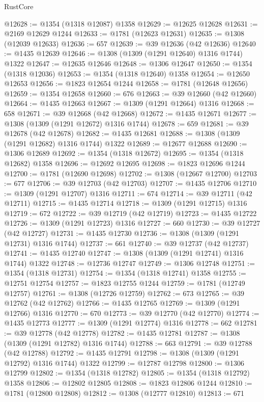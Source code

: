 \begin{lexlean}{RustCore}
\begin{coremodule}
@12628 := @1354 (@1318 @12087) @1358
@12629 := @12625 @12628
@12631 := @2169 @12629 @1244
@12633 := @1781 (@12623 @12631)
@12635 := @1308 (@12039 @12633)
@12636 := 657
@12639 := @39 @12636 (@42 @12636)
@12640 := @1435 @12639
@12646 := @1308 (@1309 (@1291 @12640) @1316 @1744) @1322
@12647 := @12635 @12646
@12648 := @1306 @12647
@12650 := @1354 (@1318 @12036)
@12653 := @1354 (@1318 @12640) @1358
@12654 := @12650 @12653
@12656 := @1823 @12654 @1244
@12658 := @1781 (@12648 @12656)
@12659 := @1354 @12658
@12660 := 676
@12663 := @39 @12660 (@42 @12660)
@12664 := @1435 @12663
@12667 := @1309 (@1291 @12664) @1316
@12668 := 658
@12671 := @39 @12668 (@42 @12668)
@12672 := @1435 @12671
@12677 := @1308 (@1309 (@1291 @12672) @1316 @1744)
@12678 := 659
@12681 := @39 @12678 (@42 @12678)
@12682 := @1435 @12681
@12688 := @1308 (@1309 (@1291 @12682) @1316 @1744) @1322
@12689 := @12677 @12688
@12690 := @1306 @12689
@12692 := @1354 (@1318 @12672)
@12695 := @1354 (@1318 @12682) @1358
@12696 := @12692 @12695
@12698 := @1823 @12696 @1244
@12700 := @1781 (@12690 @12698)
@12702 := @1308 (@12667 @12700)
@12703 := 677
@12706 := @39 @12703 (@42 @12703)
@12707 := @1435 @12706
@12710 := @1309 (@1291 @12707) @1316
@12711 := 674
@12714 := @39 @12711 (@42 @12711)
@12715 := @1435 @12714
@12718 := @1309 (@1291 @12715) @1316
@12719 := 672
@12722 := @39 @12719 (@42 @12719)
@12723 := @1435 @12722
@12726 := @1309 (@1291 @12723) @1316
@12727 := 660
@12730 := @39 @12727 (@42 @12727)
@12731 := @1435 @12730
@12736 := @1308 (@1309 (@1291 @12731) @1316 @1744)
@12737 := 661
@12740 := @39 @12737 (@42 @12737)
@12741 := @1435 @12740
@12747 := @1308 (@1309 (@1291 @12741) @1316 @1744) @1322
@12748 := @12736 @12747
@12749 := @1306 @12748
@12751 := @1354 (@1318 @12731)
@12754 := @1354 (@1318 @12741) @1358
@12755 := @12751 @12754
@12757 := @1823 @12755 @1244
@12759 := @1781 (@12749 @12757)
@12761 := @1308 (@12726 @12759)
@12762 := 673
@12765 := @39 @12762 (@42 @12762)
@12766 := @1435 @12765
@12769 := @1309 (@1291 @12766) @1316
@12770 := 670
@12773 := @39 @12770 (@42 @12770)
@12774 := @1435 @12773
@12777 := @1309 (@1291 @12774) @1316
@12778 := 662
@12781 := @39 @12778 (@42 @12778)
@12782 := @1435 @12781
@12787 := @1308 (@1309 (@1291 @12782) @1316 @1744)
@12788 := 663
@12791 := @39 @12788 (@42 @12788)
@12792 := @1435 @12791
@12798 := @1308 (@1309 (@1291 @12792) @1316 @1744) @1322
@12799 := @12787 @12798
@12800 := @1306 @12799
@12802 := @1354 (@1318 @12782)
@12805 := @1354 (@1318 @12792) @1358
@12806 := @12802 @12805
@12808 := @1823 @12806 @1244
@12810 := @1781 (@12800 @12808)
@12812 := @1308 (@12777 @12810)
@12813 := 671

\end{coremodule}
\end{lexlean}
